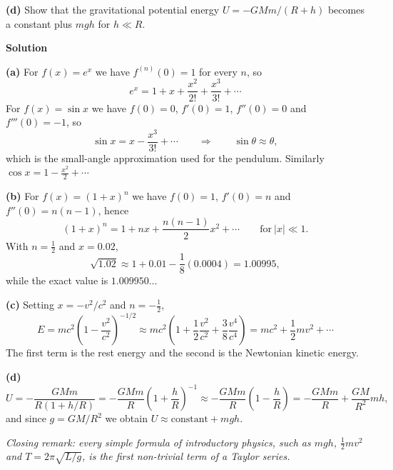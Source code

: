 \documentclass[../main.tex]{subfiles}
\begin{document}
\textbf{(d)} Show that the gravitational potential energy $U = -GMm/(R+h)$ becomes a constant plus $mgh$ for $h \ll R$.

\bigskip
\textbf{Solution}

\textbf{(a)} For $f(x) = e^x$ we have $f^{(n)}(0) = 1$ for every $n$, so
\[
e^x = 1 + x + \frac{x^2}{2!} + \frac{x^3}{3!} + \cdots
\]
For $f(x) = \sin x$ we have $f(0) = 0$, $f'(0) = 1$, $f''(0) = 0$ and $f'''(0) = -1$, so
\[
\sin x = x - \frac{x^3}{3!} + \cdots
\qquad \Longrightarrow \qquad
\sin\theta \approx \theta ,
\]
which is the small-angle approximation used for the pendulum. Similarly $\cos x = 1 - \frac{x^2}{2} + \cdots$

\textbf{(b)} For $f(x) = (1+x)^n$ we have $f(0) = 1$, $f'(0) = n$ and $f''(0) = n(n-1)$, hence
\[
(1+x)^n = 1+nx+\frac{n(n-1)}{2}x^2+\cdots
\qquad \text{for} \ |x|\ll 1 .
\]
With $n = \frac{1}{2}$ and $x = 0.02$,
\[
\sqrt{1.02} \approx 1 + 0.01 - \frac{1}{8}(0.0004) = 1.00995 ,
\]
while the exact value is $1.009950\ldots$

\textbf{(c)} Setting $x = -v^2/c^2$ and $n = -\frac{1}{2}$,
\[
E = mc^2\left(1-\frac{v^2}{c^2}\right)^{-1/2}
\approx mc^2\left(1+\frac{1}{2}\frac{v^2}{c^2}+\frac{3}{8}\frac{v^4}{c^4}\right)
= mc^2 + \frac{1}{2}mv^2 + \cdots
\]
The first term is the rest energy and the second is the Newtonian kinetic energy.

\textbf{(d)}
\[
U = -\frac{GMm}{R\left(1+h/R\right)}
= -\frac{GMm}{R}\left(1+\frac{h}{R}\right)^{-1}
\approx -\frac{GMm}{R}\left(1-\frac{h}{R}\right)
= -\frac{GMm}{R} + \frac{GM}{R^2}mh ,
\]
and since $g = GM/R^2$ we obtain $U \approx \text{constant} + mgh$.

\bigskip
\noindent \emph{Closing remark: every simple formula of introductory physics, such as $mgh$, $\frac{1}{2}mv^2$ and $T = 2\pi\sqrt{L/g}$, is the first non-trivial term of a Taylor series.}
\end{document}
